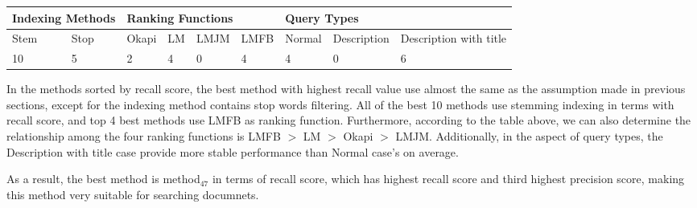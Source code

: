 \documentclass[10pt, a4paper]{article}
\begin{document}
\begin{center}
\begin{tabular}{|l|l|l|l|l|l|l|l|l|}
\hline
\multicolumn{2}{|l|}{Indexing Methods} & \multicolumn{4}{l|}{Ranking Functions} & \multicolumn{3}{l|}{Query Types}              \\ \hline
Stem               & Stop              & Okapi     & LM     & LMJM    & LMFB    & Normal & Description & Description with title \\ \hline
10                  & 5                 & 2         & 4      & 0       & 4       & 4      & 0           & 6                      \\ \hline
\end{tabular}
\end{center}

In the methods sorted by recall score, the best method with highest recall value use almost the same as the assumption made in previous sections, except for the indexing method contains stop words filtering. All of the best 10 methods use stemming indexing in terms with recall score, and top 4 best methods use LMFB as ranking function. Furthermore, according to the table above, we can also determine the relationship among the four ranking functions is LMFB $>$ LM $>$ Okapi $>$ LMJM. Additionally, in the aspect of query types, the Description with title case provide more stable performance than Normal case's on average.

As a result, the best method is method$_{47}$ in terms of recall score, which has highest recall score and third highest precision score, making this method very suitable for searching documnets.
\end{document}
